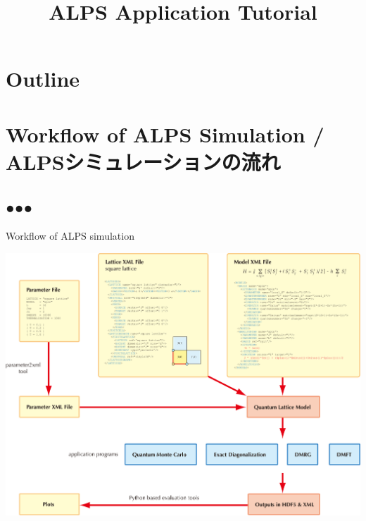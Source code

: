 
\title{ALPS Application Tutorial}




\begin{frame}
  \titlepage
\end{frame}

\section*{Outline}
\begin{frame}[t,fragile]
   \tableofcontents
\end{frame}

\section{Workflow of ALPS Simulation / ALPSシミュレーションの流れ}
\subsection*{{\protect\color{red}●}{\protect\color{blue}●}{\protect\color{green}●}}

\begin{frame}{Workflow of ALPS simulation}
  \begin{center}
    \includegraphics[height=0.8\textheight]{workflow.pdf}
  \end{center}
\end{frame}

